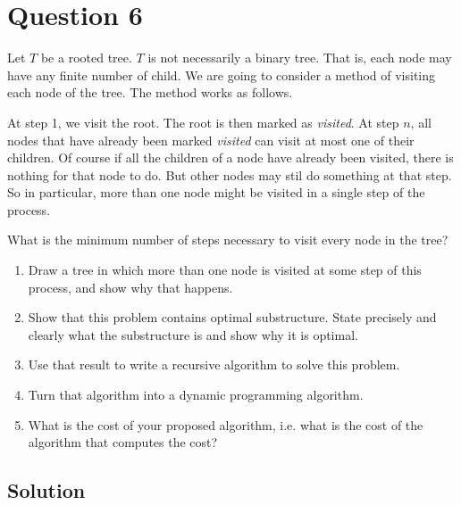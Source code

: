 
\section*{Question 6}

Let $T$ be a rooted tree.
$T$ is not necessarily a binary tree.
That is, each node may have any finite number of child.
We are going to consider a method of visiting each node of the tree.
The method works as follows.

At step 1, we visit the root.
The root is then marked as \textit{visited}.
At step $n$, all nodes that have already been marked \textit{visited} can visit at most one of their children.
Of course if all the children of a node have already been visited, there is nothing for that node to do.
But other nodes may stil do something at that step.
So in particular, more than one node might be visited in a single step of the process.

What is the minimum number of steps necessary to visit every node in the tree?

\begin{enumerate}[label=(\alph*)]
\item
Draw a tree in which more than one node is visited at some step of this process, and show why that happens.

\item
Show that this problem contains optimal substructure.
State precisely and clearly what the substructure is and show why it is optimal.

\item
Use that result to write a recursive algorithm to solve this problem.

\item
Turn that algorithm into a dynamic programming algorithm.

\item
What is the cost of your proposed algorithm, i.e. what is the cost of the algorithm that computes the cost?
\end{enumerate}

\subsection*{Solution}

